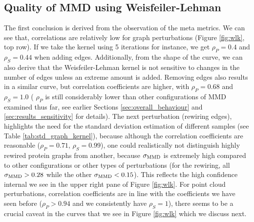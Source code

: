 \subsection{Quality of MMD using Weisfeiler-Lehman}\label{sec:quality_wl}
The first conclusion is
derived from the observation of the meta metrics. We can see that, correlations
are relatively low for graph perturbations (Figure \ref{fig:wlk}, top row). If
we take the kernel using 5 iterations for instance, we get $\rho_P=0.4$ and
$\rho_S=0.44$ when adding edges. Additionally, from the shape of the curve, we
can also derive that the Weisfeiler-Lehman kernel is not sensitive to changes in
the number of edges unless an extreme amount is added. Removing edges also
results in a similar curve, but correlation coefficients are higher, with
$\rho_P=0.68$ and $\rho_S=1.0$ ( $\rho_P$ is still considerably lower than other
configurations of MMD examined thus far, see earlier Sections
\ref{sec:overall_behaviour} and \ref{sec:results_sensitivity} for details). The
next perturbation (rewiring edges), highlights the need for the standard
deviation estimation of different samples (see Table
\ref{tab:std_graph_kernel}), because although the correlation coefficients are
reasonable ($\rho_P=0.71$, $\rho_S=0.99$), one could realistically not
distinguish highly rewired protein graphs from another, because $\sigma_{\text{MMD}}$ is
extremely high compared to other configurations or other types of perturbations
(for the rewiring, all $\sigma_{\text{MMD}}>0.28$ while the other $\sigma_{\text{MMD}}<0.15$).
This reflects the high confidence internal we see in the upper right pane of
Figure \ref{fig:wlk}. For point cloud perturbations, correlation coefficients
are in line with the coefficients we have seen before ($\rho_P>0.94$ and we
consistently have $\rho_S=1$), there seems to be a crucial caveat in the curves
that we see in Figure \ref{fig:wlk} which we discuss next.

